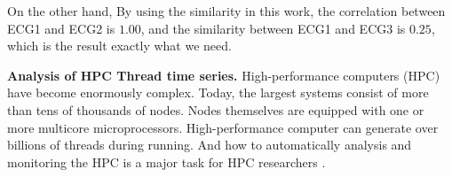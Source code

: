 On the other hand, By using the similarity in this work, the correlation between ECG1 and ECG2 is $1.00$, and the similarity between ECG1 and ECG3 is $0.25$, which is the result exactly what we need.

%








\textbf{Analysis of HPC Thread time series.}
High-performance computers (HPC) have become enormously complex. Today, the largest systems consist of more than tens of thousands of nodes. Nodes themselves are equipped with one or more multicore microprocessors\cite{adhianto2010hpctoolkit}. 
High-performance computer can generate over billions of threads during running.
And how to automatically analysis and monitoring the HPC is a major task for HPC researchers \cite{mccurdy2010memphis,tallent2009effective}.


